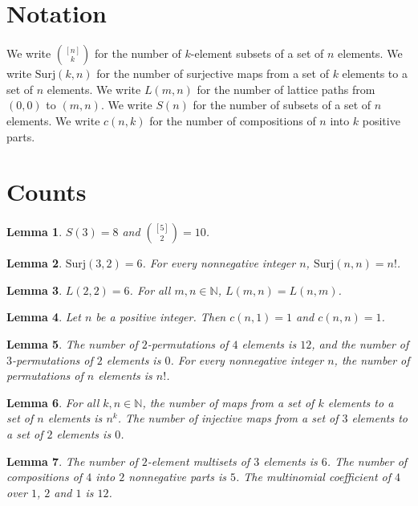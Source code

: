 \documentclass{article}
\newtheorem{lemma}{Lemma}
\begin{document}
\section{Notation}

We write $\binom{[n]}{k}$ for the number of $k$-element subsets of a set of $n$ elements.
We write $\mathrm{Surj}(k,n)$ for the number of surjective maps from a set of $k$ elements to a set of $n$ elements.
We write $L(m,n)$ for the number of lattice paths from $(0,0)$ to $(m,n)$.
We write $S(n)$ for the number of subsets of a set of $n$ elements.
We write $c(n,k)$ for the number of compositions of $n$ into $k$ positive parts.

\section{Counts}

\begin{lemma}\label{subsets}
$S(3)=8$ and $\binom{[5]}{2}=10$.
\end{lemma}

\begin{lemma}\label{surjections}
$\mathrm{Surj}(3,2)=6$. For every nonnegative integer $n$, $\mathrm{Surj}(n,n)=n!$.
\end{lemma}

\begin{lemma}\label{paths}
$L(2,2)=6$. For all $m,n\in\mathbb{N}$, $L(m,n)=L(n,m)$.
\end{lemma}

\begin{lemma}\label{compositions}
Let $n$ be a positive integer. Then $c(n,1)=1$ and $c(n,n)=1$.
\end{lemma}

\begin{lemma}\label{arrangements}
The number of $2$-permutations of $4$ elements is $12$, and the number of $3$-permutations of $2$ elements is $0$. For every nonnegative integer $n$, the number of permutations of $n$ elements is $n!$.
\end{lemma}

\begin{lemma}\label{maps}
For all $k,n\in\mathbb{N}$, the number of maps from a set of $k$ elements to a set of $n$ elements is $n^k$. The number of injective maps from a set of $3$ elements to a set of $2$ elements is $0$.
\end{lemma}

\begin{lemma}\label{multisets}
The number of $2$-element multisets of $3$ elements is $6$. The number of compositions of $4$ into $2$ nonnegative parts is $5$. The multinomial coefficient of $4$ over $1$, $2$ and $1$ is $12$.
\end{lemma}
\end{document}

